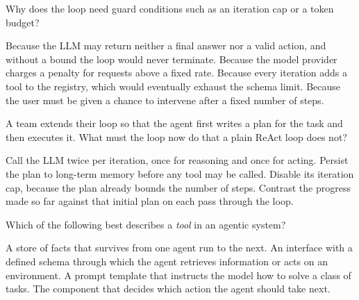 \begin{questions}

\qitem Why does the loop need guard conditions such as an iteration cap or a token budget?
\begin{choices}
  \CorrectChoice Because the LLM may return neither a final answer nor a valid action, and without a bound the loop would never terminate.
  \choice Because the model provider charges a penalty for requests above a fixed rate.
  \choice Because every iteration adds a tool to the registry, which would eventually exhaust the schema limit.
  \choice Because the user must be given a chance to intervene after a fixed number of steps.
\end{choices}
\dontknow
{}

\qitem A team extends their loop so that the agent first writes a plan for the task and then executes
it. What must the loop now do that a plain ReAct loop does not?
\begin{choices}
  \choice Call the LLM twice per iteration, once for reasoning and once for acting.
  \choice Persist the plan to long-term memory before any tool may be called.
  \choice Disable its iteration cap, because the plan already bounds the number of steps.
  \CorrectChoice Contrast the progress made so far against that initial plan on each pass through the loop.
\end{choices}
\dontknow
{}

\qitem Which of the following best describes a \emph{tool} in an agentic system?
\begin{choices}
  \choice A store of facts that survives from one agent run to the next.
  \CorrectChoice An interface with a defined schema through which the agent retrieves information or acts on an environment.
  \choice A prompt template that instructs the model how to solve a class of tasks.
  \choice The component that decides which action the agent should take next.
\end{choices}
\dontknow
{}


\end{questions}
